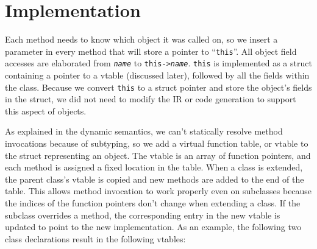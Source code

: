 \documentclass{article}
\begin{document}
\section{Implementation}

Each method needs to know which object it was called on, so we insert a
parameter in every method that will store a pointer to ``\texttt{this}''.
All object field accesses are elaborated from \texttt{\emph{name}} to
\texttt{this->\emph{name}}. \texttt{this} is implemented as a struct containing
a pointer to a vtable (discussed later), followed by all the fields within the
class. Because we convert \texttt{this} to a struct pointer and store the
object's fields in the struct, we did not need to modify the IR or code
generation to support this aspect of objects.

As explained in the dynamic semantics, we can't statically resolve method
invocations because of subtyping, so we add a virtual function table, or vtable
to the struct representing an object. The vtable is an array of function
pointers, and each method is assigned a fixed location in the table. When a
class is extended, the parent class's vtable is copied and new methods are
added to the end of the table. This allows method invocation to work properly
even on subclasses because the indices of the function pointers don't change
when extending a class. If the subclass overrides a method, the corresponding
entry in the new vtable is updated to point to the new implementation. As an
example, the following two class declarations result in the following vtables:
\end{document}
